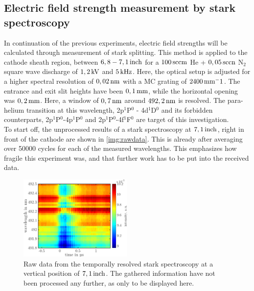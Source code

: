 \documentclass[a4paper,10pt,twoside]{article}
\begin{document}
	\subsection{Electric field strength measurement by stark spectroscopy}
		
		In continuation of the previous experiments, electric field strengths will be calculated through measurement of stark splitting. This method is applied to the cathode sheath region, between $\unit[6,8-7,1]{inch}$ for a $\unit[100]{sccm}$ He + $\unit[0,05]{sccn}$ N$_2$ square wave discharge of $\unit[1,2]{kV}$ and $\unit[5]{kHz}$. Here, the optical setup is adjusted for a higher spectral resolution of $\unit[0,02]{nm}$ with a MC grating of $\unit[2400]{mm^-1}$. The entrance and exit slit heights have been $\unit[0,1]{mm}$, while the horizontal opening was $\unit[0,2]{mm}$. Here, a window of $\unit[0,7]{nm}$ around $\unit[492,2]{nm}$ is resolved. The para-helium transition at this wavelength, 2p$^1$P$^0$ - 4d$^1$D$^0$ and its forbidden counterparts, 2p$^1$P$^0$-4p$^1$P$^0$ and 2p$^1$P$^0$-4f$^1$F$^0$ are target of this investigation.\\
		To start off, the unprocessed results of a stark spectroscopy at $\unit[7,1]{inch}$, right in front of the cathode are shown in \autoref{img:rawdata}. This is already after averaging over 50000 cycles for each of the measured wavelengths. This emphasizes how fragile this experiment was, and that further work has to be put into the received data.
		
			\begin{figure}[b!]
				\centering
				\includegraphics[width=0.5\textwidth]{figures/stark/stark_71inraw.pdf}
				\caption{Raw data from the temporally resolved stark spectroscopy at a vertical position of $\unit[7,1]{inch}$. The gathered information have not been processed any further, as only to be displayed here.}
				\label{img:rawdata}
			\end{figure}
			
\end{document}
